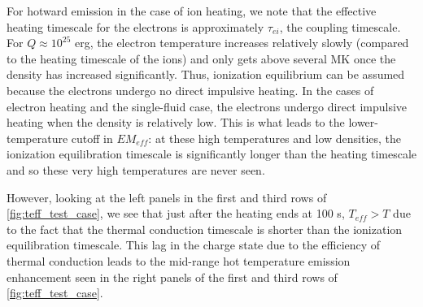 \documentclass[apj]{emulateapj}
\begin{document}
	\par For hotward emission in the case of ion heating, we note that the effective heating timescale for the electrons is approximately $\tau_{ei}$, the coupling timescale. For $Q\approx10^{25}$ erg, the electron temperature increases relatively slowly (compared to the heating timescale of the ions) and only gets above several MK once the density has increased significantly. Thus, ionization equilibrium can be assumed because the electrons undergo no direct impulsive heating. In the cases of electron heating and the single-fluid case, the electrons undergo direct impulsive heating when the density is relatively low. This is what leads to the lower-temperature cutoff in $EM_{eff}$: at these high temperatures and low densities, the ionization equilibration timescale is significantly longer than the heating timescale and so these very high temperatures are never seen. 
	\par However, looking at the left panels in the first and third rows of \autoref{fig:teff_test_case}, we see that just after the heating ends at 100 s, $T_{eff}>T$ due to the fact that the thermal conduction timescale is shorter than the ionization equilibration timescale. This lag in the charge state due to the efficiency of thermal conduction leads to the mid-range hot temperature emission enhancement seen in the right panels of the first and third rows of \autoref{fig:teff_test_case}. 
\end{document}
